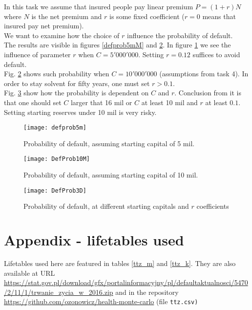 \documentclass[11pt,wide]{mwart}
\begin{document}
In this task we assume that insured people pay linear premium $P = (1+r)N$ where $N$ is the net premium and $r$ is some fixed coefficient ($r = 0$ means that insured pay net premium).\\
We want to examine how the choice of $r$ influence the probability of default.\\
The results are visible in figures \ref{defprob5mM} and \ref{DefProb10M}. In figure \ref{defprob5m} we see the influence of parameter $r$ when $C = 5'000'000$. Setting $r = 0.12$ suffices to avoid default.\\
Fig. \ref{DefProb10M} shows such probability when $C = 10'000'000$ (assumptions from task 4). In order to stay solvent for fifty years, one must set $r > 0.1$.\\
Fig. \ref{DefProb3D} show how the probability is dependent on $C$ and $r$. Conclusion from it is that one should set $C$ larger that 16 mil or $C$ at least 10 mil and $r$ at least $0.1$. Setting starting reserves under 10 mil is very risky.

\begin{figure}[!htbp]
	\caption{Probability of default, assuming starting capital of 5 mil.}
	\label{defprob5m}
	\texttt{[image: defprob5m]}
	\centering
\end{figure}

\begin{figure}[!htbp]
	\caption{Probability of default, assuming starting capital of 10 mil.}
	\label{DefProb10M}
	\texttt{[image: DefProb10M]}
	\centering
\end{figure}
\begin{figure}[!htbp]
	\caption{Probability of default, at different starting capitals and $r$ coefficients}
	\label{DefProb3D}
	\texttt{[image: DefProb3D]}
	\centering
\end{figure}

\newpage

\section{Appendix - lifetables used}
\label{lifetables}

Lifetables used here are featured in tables \ref{ttz_m} and \ref{ttz_k}. They are also available at URL \url{https://stat.gov.pl/download/gfx/portalinformacyjny/pl/defaultaktualnosci/5470/2/11/1/trwanie_zycia_w_2016.zip} and in the repository \url{https://github.com/ozonowicz/health-monte-carlo} (file \tt{ttz.csv})
\end{document}
